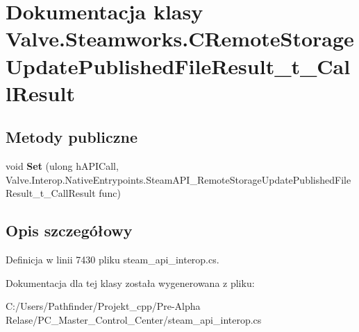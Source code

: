 \hypertarget{class_valve_1_1_steamworks_1_1_c_remote_storage_update_published_file_result__t___call_result}{}\section{Dokumentacja klasy Valve.\+Steamworks.\+C\+Remote\+Storage\+Update\+Published\+File\+Result\+\_\+t\+\_\+\+Call\+Result}
\label{class_valve_1_1_steamworks_1_1_c_remote_storage_update_published_file_result__t___call_result}
\subsection*{Metody publiczne}
\begin{DoxyCompactItemize}
\item 
\mbox{\label{class_valve_1_1_steamworks_1_1_c_remote_storage_update_published_file_result__t___call_result_a112eb5ac8c168fa2e89b75f1436cc1b9}} 
void {\bfseries Set} (ulong h\+A\+P\+I\+Call, Valve.\+Interop.\+Native\+Entrypoints.\+Steam\+A\+P\+I\+\_\+\+Remote\+Storage\+Update\+Published\+File\+Result\+\_\+t\+\_\+\+Call\+Result func)
\end{DoxyCompactItemize}


\subsection{Opis szczegółowy}


Definicja w linii 7430 pliku steam\+\_\+api\+\_\+interop.\+cs.



Dokumentacja dla tej klasy została wygenerowana z pliku\+:\begin{DoxyCompactItemize}
\item 
C\+:/\+Users/\+Pathfinder/\+Projekt\+\_\+cpp/\+Pre-\/\+Alpha Relase/\+P\+C\+\_\+\+Master\+\_\+\+Control\+\_\+\+Center/steam\+\_\+api\+\_\+interop.\+cs\end{DoxyCompactItemize}
